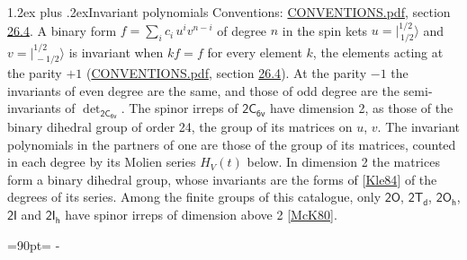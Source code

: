 \documentclass[10pt,a4paper]{article}
\makeatletter
\renewcommand\section{\@startsection{section}{1}{\z@}{-3ex plus -1ex minus -.2ex}%
  {1.2ex plus .2ex}{\normalfont\large\sffamily\bfseries\color{parttitle}}}
\newcommand{\needspace}[1]{\par\penalty-100\begingroup\dimen0=#1\relax\dimen2=\pagegoal
  \advance\dimen2-\pagetotal\ifdim\dimen0>\dimen2\relax\ifdim\dimen2>0pt\vfil\break\fi\fi
  \endgroup}
\numberwithin{equation}{section}
\newcommand{\grp}[1]{\mathsf{#1}}
\newcommand{\jm}[2]{\bigl\lvert{}^{#1}_{\,#2}\bigr\rangle}
\makeatother
\begin{document}
\section{Invariant polynomials}\label{s:invariants}
Conventions: \href{../../CONVENTIONS.pdf}{CONVENTIONS.pdf}, section \href{../../CONVENTIONS.pdf\#conv.26.4}{26.4}.
\leavevmode\label{n:local.binary.form}A binary form $f = \sum_i c_i\, u^i v^{n-i}$ of degree $n$ in the spin kets $u = \jm{1/2}{1/2}$ and $v = \jm{1/2}{-1/2}$ is invariant when $k f = f$ for every element $k$, the elements acting at the parity $+1$ (\href{../../CONVENTIONS.pdf}{CONVENTIONS.pdf}, section \href{../../CONVENTIONS.pdf\#conv.26.4}{26.4}). At the parity $-1$ the invariants of even degree are the same, and those of odd degree are the semi-invariants of $\det_{\grp{2C_{6v}}}$.
The spinor irreps of $\grp{2C_{6v}}$ have dimension 2, as those of the binary dihedral group of order 24, the group of its matrices on $u$, $v$. \label{n:function.hilbert}The invariant polynomials in the partners of one are those of the group of its matrices, counted in each degree by its Molien series $H_V(t)$ below. In dimension 2 the matrices form a binary dihedral group, whose invariants are the forms of [\href{../../../REFERENCES.pdf\#ref.Kle84}{Kle84}] of the degrees of its series. Among the finite groups of this catalogue, only $\grp{2O}$, $\grp{2T_{d}}$, $\grp{2O_{h}}$, $\grp{2I}$ and $\grp{2I_{h}}$ have spinor irreps of dimension above 2 [\href{../../../REFERENCES.pdf\#ref.McK80}{McK80}].
\needspace{90pt}
\end{document}
